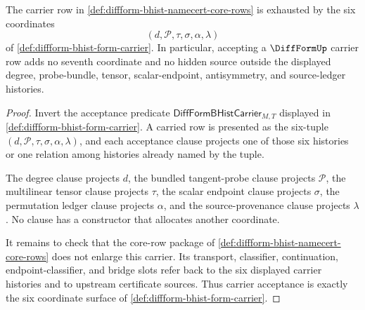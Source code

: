 \begin{theorem}
\label{thm:diffform-bhist-carrier-obligation}
The carrier row in
\autoref{def:diffform-bhist-namecert-core-rows} is exhausted by the six
coordinates
$$
(d,\mathcal{P},\tau,\sigma,\alpha,\lambda)
$$
of \autoref{def:diffform-bhist-form-carrier}. In particular, accepting a
$\DiffFormUp$ carrier row adds no seventh coordinate and no hidden source
outside the displayed degree, probe-bundle, tensor, scalar-endpoint,
antisymmetry, and source-ledger histories.
\end{theorem}
\begin{proof}
Invert the acceptance predicate
$\mathsf{DiffFormBHistCarrier}_{M,T}$ displayed in
\autoref{def:diffform-bhist-form-carrier}. A carried row is presented as the
six-tuple $(d,\mathcal{P},\tau,\sigma,\alpha,\lambda)$, and each acceptance
clause projects one of those six histories or one relation among histories
already named by the tuple.

The degree clause projects $d$, the bundled tangent-probe clause projects
$\mathcal{P}$, the multilinear tensor clause projects $\tau$, the scalar
endpoint clause projects $\sigma$, the permutation ledger clause projects
$\alpha$, and the source-provenance clause projects $\lambda$. No clause has
a constructor that allocates another coordinate.

It remains to check that the core-row package of
\autoref{def:diffform-bhist-namecert-core-rows} does not enlarge this
carrier. Its transport, classifier, continuation, endpoint-classifier, and
bridge slots refer back to the six displayed carrier histories and to
upstream certificate sources. Thus carrier acceptance is exactly the six
coordinate surface of \autoref{def:diffform-bhist-form-carrier}.
\end{proof}

